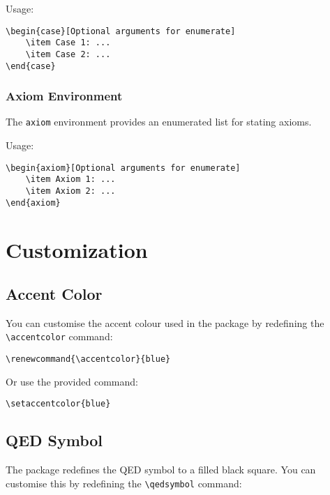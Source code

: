 \documentclass{ltxdoc}
\newcommand{\env}[1]{\texttt{#1}}
\newcommand{\cmnd}[1]{\texttt{\textbackslash#1}}
\begin{document}
Usage:
\begin{verbatim}
\begin{case}[Optional arguments for enumerate]
    \item Case 1: ...
    \item Case 2: ...
\end{case}
\end{verbatim}

\subsubsection{Axiom Environment}

The \env{axiom} environment provides an enumerated list for stating axioms.

Usage:
\begin{verbatim}
\begin{axiom}[Optional arguments for enumerate]
    \item Axiom 1: ...
    \item Axiom 2: ...
\end{axiom}
\end{verbatim}

\section{Customization}

\subsection{Accent Color}

You can customise the accent colour used in the package by redefining the \cmnd{accentcolor} command:

\begin{verbatim}
\renewcommand{\accentcolor}{blue}
\end{verbatim}

Or use the provided command:

\begin{verbatim}
\setaccentcolor{blue}
\end{verbatim}

\subsection{QED Symbol}

The package redefines the QED symbol to a filled black square. You can customise this by redefining the \cmnd{qedsymbol} command:
\end{document}
